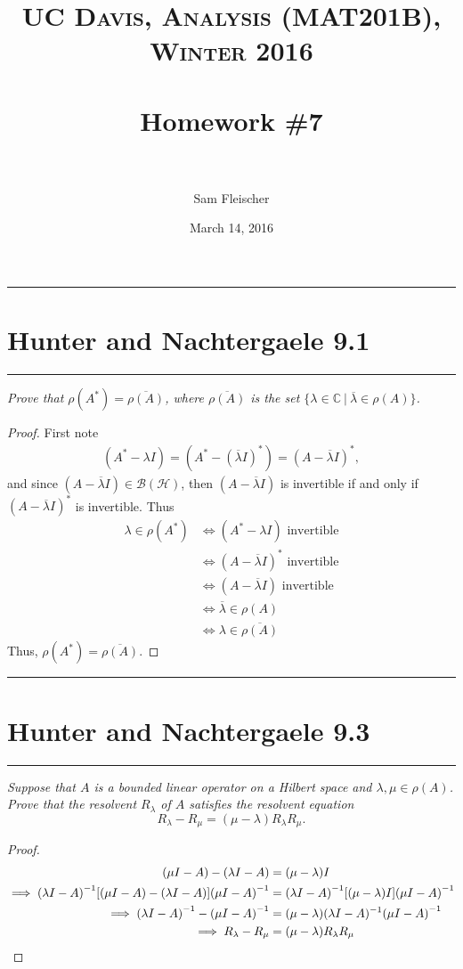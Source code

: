 \documentclass{article} %
\title{ 
\normalfont \normalsize 
\textsc{UC Davis, Analysis (MAT201B), Winter 2016} \\ [25pt] %
\horrule{2pt} \\[0.4cm] %
\Huge Homework \#7 \\ %
\horrule{2pt} \\[0.5cm] %
}
\author{\huge Sam Fleischer} %
\date{March 14, 2016} %
\theoremstyle{plain}
\def\Cx{\mathbb{C}}
\newcommand{\Hilb}{\mathcal{H}}
\newcommand{\problem}[1]{
\vspace{.375cm}
\begin{minipage}{\textwidth}
    \begin{center}
        \noindent\rule{5cm}{1pt}
    \end{center}
    \section{\bf #1}
    \begin{center}
        \noindent\rule{5cm}{1pt}
    \end{center}
    \vspace{0.25cm}
\end{minipage}
}
\numberwithin{equation}{section} %
\numberwithin{figure}{section} %
\numberwithin{table}{section} %
\begin{document}
\thispagestyle{empty}

\maketitle %

\makeatletter
{}
\makeatother

\pagebreak

\problem{Hunter and Nachtergaele 9.1}
\emph{Prove that $\rho(A^*) = \overline{\rho(A)}$, where $\overline{\rho(A)}$ is the set $\{\lambda \in \Cx\ |\ \overline{\lambda} \in \rho(A)\}$.}
\begin{proof}
    First note
    \begin{align*}
        (A^* - \lambda I) = (A^* - (\overline{\lambda}I)^*) = (A - \overline{\lambda}I)^*,
    \end{align*}
    and since $(A - \overline{\lambda}I) \in \mathcal{B}(\Hilb)$, then $(A - \overline{\lambda}I)$ is invertible if and only if $(A - \overline{\lambda}I)^*$ is invertible.  Thus
    \begin{align*}
        \lambda \in \rho(A^*) &\iff (A^* - \lambda I) \text{ invertible} \\
        &\iff (A - \overline{\lambda}I)^* \text{ invertible} \\
        &\iff (A - \overline{\lambda} I) \text{ invertible} \\
        &\iff \overline{\lambda} \in \rho(A) \\
        &\iff \lambda \in \overline{\rho(A)}
    \end{align*}
    Thus, $\rho(A^*) = \overline{\rho(A)}$.
\end{proof}









\problem{Hunter and Nachtergaele 9.3}
\emph{Suppose that $A$ is a bounded linear operator on a Hilbert space and $\lambda,\mu \in \rho(A)$.  Prove that the resolvent $R_\lambda$ of $A$ satisfies the \emph{resolvent equation} $$R_\lambda - R_\mu = (\mu - \lambda)R_\lambda R_\mu.$$}
\begin{proof}
    \begin{align*}
        \qty(\mu I - A) - \qty(\lambda I - A) &= (\mu - \lambda)I \\
        \implies \qty(\lambda I - A)^{-1}\qty[\qty(\mu I - A) - \qty(\lambda I - A)]\qty(\mu I - A)^{-1} &= \qty(\lambda I - A)^{-1}\qty[(\mu - \lambda)I]\qty(\mu I - A)^{-1} \\
        \implies \qty(\lambda I - A)^{-1} - \qty(\mu I - A)^{-1} &= \qty(\mu - \lambda)(\lambda I - A)^{-1}\qty(\mu I - A)^{-1} \\
        \implies R_\lambda - R_\mu &= (\mu - \lambda)R_\lambda R_\mu
    \end{align*}
\end{proof}
\end{document}
